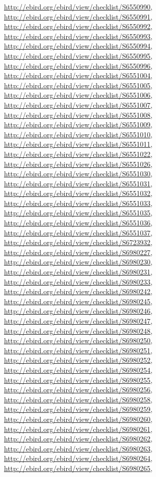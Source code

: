 \documentclass[9pt, article]{memoir}
\begin{document}
\begin{multicols}{2}
\url{http://ebird.org/ebird/view/checklist/S6550990}, 
\url{http://ebird.org/ebird/view/checklist/S6550991}, 
\url{http://ebird.org/ebird/view/checklist/S6550992}, 
\url{http://ebird.org/ebird/view/checklist/S6550993}, 
\url{http://ebird.org/ebird/view/checklist/S6550994}, 
\url{http://ebird.org/ebird/view/checklist/S6550995}, 
\url{http://ebird.org/ebird/view/checklist/S6550996}, 
\url{http://ebird.org/ebird/view/checklist/S6551004}, 
\url{http://ebird.org/ebird/view/checklist/S6551005}, 
\url{http://ebird.org/ebird/view/checklist/S6551006}, 
\url{http://ebird.org/ebird/view/checklist/S6551007}, 
\url{http://ebird.org/ebird/view/checklist/S6551008}, 
\url{http://ebird.org/ebird/view/checklist/S6551009}, 
\url{http://ebird.org/ebird/view/checklist/S6551010}, 
\url{http://ebird.org/ebird/view/checklist/S6551011}, 
\url{http://ebird.org/ebird/view/checklist/S6551022}, 
\url{http://ebird.org/ebird/view/checklist/S6551026}, 
\url{http://ebird.org/ebird/view/checklist/S6551030}, 
\url{http://ebird.org/ebird/view/checklist/S6551031}, 
\url{http://ebird.org/ebird/view/checklist/S6551032}, 
\url{http://ebird.org/ebird/view/checklist/S6551033}, 
\url{http://ebird.org/ebird/view/checklist/S6551035}, 
\url{http://ebird.org/ebird/view/checklist/S6551036}, 
\url{http://ebird.org/ebird/view/checklist/S6551037}, 
\url{http://ebird.org/ebird/view/checklist/S6723932}, 
\url{http://ebird.org/ebird/view/checklist/S6980227}, 
\url{http://ebird.org/ebird/view/checklist/S6980230}, 
\url{http://ebird.org/ebird/view/checklist/S6980231}, 
\url{http://ebird.org/ebird/view/checklist/S6980233}, 
\url{http://ebird.org/ebird/view/checklist/S6980242}, 
\url{http://ebird.org/ebird/view/checklist/S6980245}, 
\url{http://ebird.org/ebird/view/checklist/S6980246}, 
\url{http://ebird.org/ebird/view/checklist/S6980247}, 
\url{http://ebird.org/ebird/view/checklist/S6980248}, 
\url{http://ebird.org/ebird/view/checklist/S6980250}, 
\url{http://ebird.org/ebird/view/checklist/S6980251}, 
\url{http://ebird.org/ebird/view/checklist/S6980252}, 
\url{http://ebird.org/ebird/view/checklist/S6980254}, 
\url{http://ebird.org/ebird/view/checklist/S6980255}, 
\url{http://ebird.org/ebird/view/checklist/S6980256}, 
\url{http://ebird.org/ebird/view/checklist/S6980258}, 
\url{http://ebird.org/ebird/view/checklist/S6980259}, 
\url{http://ebird.org/ebird/view/checklist/S6980260}, 
\url{http://ebird.org/ebird/view/checklist/S6980261}, 
\url{http://ebird.org/ebird/view/checklist/S6980262}, 
\url{http://ebird.org/ebird/view/checklist/S6980263}, 
\url{http://ebird.org/ebird/view/checklist/S6980264}, 
\url{http://ebird.org/ebird/view/checklist/S6980265}, 

\end{multicols}
\end{document}
